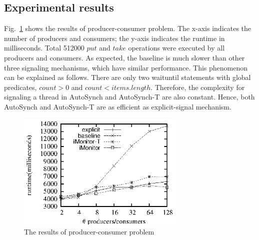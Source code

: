 \documentclass[preprint]{sigplanconf}
\begin{document}
%
\subsection{Experimental results}


Fig.~\ref{fig:pc_eval} shows the results of producer-consumer problem. The 
x-axis indicates the number of producers and consumers; the y-axis indicates 
the runtime in milliseconds. Total 
512000 $put$ and $take$ operations were executed by
all producers and consumers. As expected, the baseline is much slower than
other three signaling mechanisms, which have similar performance. This 
phenomenon can be explained as follows. There are only two waituntil statements 
with global predicates, $count > 0$ and $count < items.length$. Therefore, the 
complexity for signaling a thread in AutoSynch and AutoSynch-T are also constant. 
Hence, both AutoSynch and AutoSynch-T are as efficient as explicit-signal 
mechanism. 

\begin{figure}[ht!]
  \centering
  \includegraphics[width=80mm]{fig/pc.eps}
  \caption{The results of producer-consumer problem}
  \label{fig:pc_eval}
\end{figure}
\end{document}
